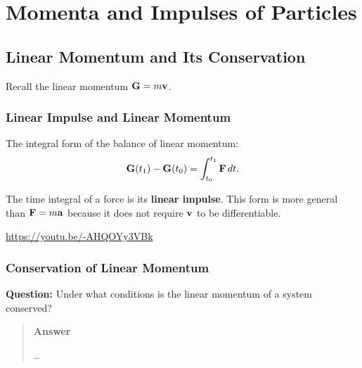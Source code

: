 \documentclass[
  letterpaper,
  DIV=11,
  numbers=noendperiod]{scrreprt}
\begin{document}
\chapter{Momenta and Impulses of
Particles}\label{momenta-and-impulses-of-particles}

\section{Linear Momentum and Its
Conservation}\label{linear-momentum-and-its-conservation}

Recall the linear momentum \({\bf G} = m{\bf v}\).

\subsection{Linear Impulse and Linear
Momentum}\label{linear-impulse-and-linear-momentum}

The integral form of the balance of linear momentum: \begin{align}
    {\bf G}(t_1)-{\bf G}(t_0) = \int_{t_0}^{t_1}{\bf F}\,dt.
\end{align}

The time integral of a force is its \textbf{linear impulse}. This form
is more general than \({\bf F}=m{\bf a}\) because it does not require
\({\bf v}\) to be differentiable.

\url{https://youtu.be/-AHQOYy3VBk}

\subsection{Conservation of Linear
Momentum}\label{conservation-of-linear-momentum}

\begin{tcolorbox}[enhanced jigsaw, arc=.35mm, bottomrule=.15mm, bottomtitle=1mm, breakable, colback=white, colbacktitle=quarto-callout-tip-color!10!white, colframe=quarto-callout-tip-color-frame, coltitle=black, left=2mm, leftrule=.75mm, opacityback=0, opacitybacktitle=0.6, rightrule=.15mm, title=\textcolor{quarto-callout-tip-color}{\faLightbulb}\hspace{0.5em}{Think!}, titlerule=0mm, toprule=.15mm, toptitle=1mm]

\textbf{Question:} Under what conditions is the linear momentum of a
system conserved?

\begin{quote}
\textbf{Answer}

\ldots{}
\end{quote}

\end{tcolorbox}
\end{document}
